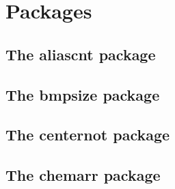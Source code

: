 \documentclass[a4paper,12pt]{article}
\makeatletter
\newcommand*{\xpackage}[1]{\textsf{#1}}
\newcommand*{\xoption}[1]{\textsf{#1}}
\newcommand*{\cs}[1]{\texttt{\textbackslash#1}}
\newcommand*{\tocinclude}[1]{%
  \setcounter{tocdepth}{3}%
  \begingroup
    \makeatletter
    \def\@prj{#1}%
    \let\contentsline\foreign@contentsline
  \endgroup
}
\def\foreign@contentsline#1#2#3#4{%
  \ifx\\#4\\%
    \csname l@#1\endcsname{#2}{#3}%
  \else
    \ifHy@linktocpage
      \csname l@#1\endcsname{{#2}}{%
        \hyper@linkfile{#3}{\@prj.pdf}{#4}%
      }%
    \else
      \csname l@#1\endcsname{%
        \hyper@linkfile{#2}{\@prj.pdf}{#4}%
      }{#3}%
    \fi
  \fi
}%
\newcommand*{\pkgsectformat}[1]{%
  \texorpdfstring{%
    \textcolor{link}{The} %
    \xpackage{#1} %
    \textcolor{link}{package}%
  }{#1}%
}
\makeatother
\begin{document}
\section{Packages}
\hypersetup{bookmarksnumbered=false}

\subsection{\pkgsectformat{aliascnt}}
\label{aliascnt}
\begin{abstract}
Package \xpackage{aliascnt} introduces \emph{alias counters} that
share the same counter register and clear list.
\end{abstract}
\tocinclude{aliascnt}

\newpage
\subsection{\pkgsectformat{bmpsize}}
\label{bmpsize}
\begin{abstract}
Package \xpackage{bmpsize} analyzes bitmap images to extract
size and resolution data. It adds this feature to the graphics package
that now do not need separate bounding box files for bitmap images.
Additionally the implementation for the inclusion of bitmap images
in some drivers of package \xpackage{graphicx} are rewritten to support
options \xoption{viewport}, \xoption{trim} and \xoption{clip}.
\end{abstract}
\tocinclude{bmpsize}

\newpage
\subsection{\pkgsectformat{centernot}}
\label{centernot}
\begin{abstract}
This package provides \cs{centernot} that prints the symbol
\cs{not} on the following argument. Unlike \cs{not} the symbol
is horizontally centered.
\end{abstract}
\tocinclude{centernot}

\newpage
\subsection{\pkgsectformat{chemarr}}
\label{chemarr}
\begin{abstract}
Very often chemists need a longer version
of reaction arrows (\cs{rightleftharpoons}) with
the possibility to put text above and below.
Analogous to \xpackage{amsmath}'s \cs{xrightarrow} and
\cs{xleftarrow} this package provides the macro
\cs{xrightleftharpoons}.
\end{abstract}
\tocinclude{chemarr}
\end{document}

